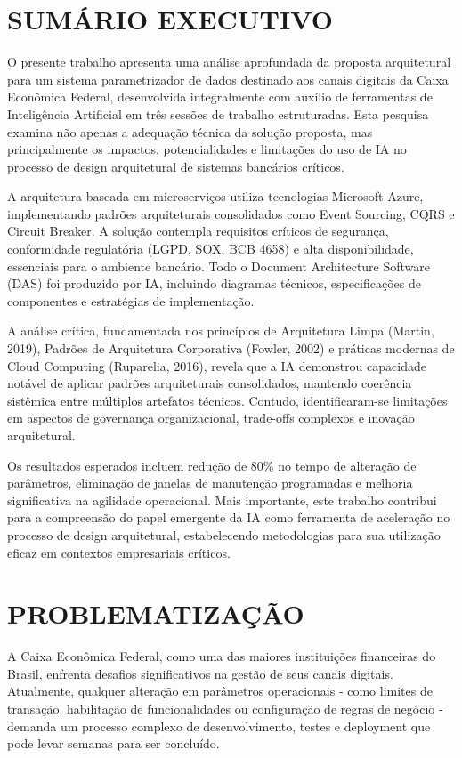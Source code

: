 \chapter{SUMÁRIO EXECUTIVO}

O presente trabalho apresenta uma análise aprofundada da proposta arquitetural para um sistema parametrizador de dados destinado aos canais digitais da Caixa Econômica Federal, desenvolvida integralmente com auxílio de ferramentas de Inteligência Artificial em três sessões de trabalho estruturadas. Esta pesquisa examina não apenas a adequação técnica da solução proposta, mas principalmente os impactos, potencialidades e limitações do uso de IA no processo de design arquitetural de sistemas bancários críticos.

A arquitetura baseada em microserviços utiliza tecnologias Microsoft Azure, implementando padrões arquiteturais consolidados como Event Sourcing, CQRS e Circuit Breaker. A solução contempla requisitos críticos de segurança, conformidade regulatória (LGPD, SOX, BCB 4658) e alta disponibilidade, essenciais para o ambiente bancário. Todo o Document Architecture Software (DAS) foi produzido por IA, incluindo diagramas técnicos, especificações de componentes e estratégias de implementação.

A análise crítica, fundamentada nos princípios de Arquitetura Limpa (Martin, 2019), Padrões de Arquitetura Corporativa (Fowler, 2002) e práticas modernas de Cloud Computing (Ruparelia, 2016), revela que a IA demonstrou capacidade notável de aplicar padrões arquiteturais consolidados, mantendo coerência sistêmica entre múltiplos artefatos técnicos. Contudo, identificaram-se limitações em aspectos de governança organizacional, trade-offs complexos e inovação arquitetural.

Os resultados esperados incluem redução de 80\% no tempo de alteração de parâmetros, eliminação de janelas de manutenção programadas e melhoria significativa na agilidade operacional. Mais importante, este trabalho contribui para a compreensão do papel emergente da IA como ferramenta de aceleração no processo de design arquitetural, estabelecendo metodologias para sua utilização eficaz em contextos empresariais críticos.

\chapter{PROBLEMATIZAÇÃO}

A Caixa Econômica Federal, como uma das maiores instituições financeiras do Brasil, enfrenta desafios significativos na gestão de seus canais digitais. Atualmente, qualquer alteração em parâmetros operacionais - como limites de transação, habilitação de funcionalidades ou configuração de regras de negócio - demanda um processo complexo de desenvolvimento, testes e deployment que pode levar semanas para ser concluído.

